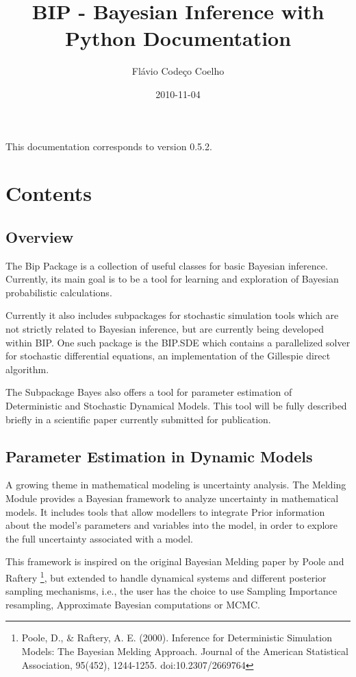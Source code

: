 \documentclass[a4paper,10pt,english]{sphinxmanual}
\title{BIP - Bayesian Inference with Python Documentation}
\date{2010-11-04}
\author{Flávio Codeço Coelho}
\begin{document}
\maketitle
\tableofcontents
{}\label{index::doc}


This documentation corresponds to version 0.5.2.


\chapter{Contents}
\label{index:contents}\label{index:welcome-to-bip-bayesian-inference-with-python-s-documentation}

\section{Overview}
\label{overview:overview}\label{overview::doc}
The Bip Package is a collection of useful classes for basic Bayesian inference. Currently, its main goal is to be a tool for learning and exploration of Bayesian probabilistic calculations.

Currently it also includes subpackages for stochastic simulation tools which are not strictly related to Bayesian inference, but are currently being developed within BIP. One such package is the BIP.SDE which contains a parallelized solver for stochastic differential equations, an implementation of the Gillespie direct algorithm.

The Subpackage Bayes also offers a tool for parameter estimation of Deterministic and Stochastic Dynamical Models. This tool will be fully described briefly in a scientific paper currently submitted for publication.


\section{Parameter Estimation in Dynamic Models}
\label{paramest:parameter-estimation-in-dynamic-models}\label{paramest::doc}
A growing theme in mathematical modeling is uncertainty analysis. The Melding Module provides a Bayesian framework to analyze uncertainty in mathematical models. It includes tools that allow modellers to integrate Prior information about the model's parameters and variables into the model, in order to explore the full uncertainty associated with a model.

This framework is inspired on the original Bayesian Melding paper by Poole and Raftery \footnote{
Poole, D., \& Raftery, A. E. (2000). Inference for Deterministic Simulation Models: The Bayesian Melding Approach. Journal of the American Statistical Association, 95(452), 1244-1255. doi:10.2307/2669764
}, but extended to handle dynamical systems and different posterior sampling mechanisms, i.e., the user has the choice to use Sampling Importance resampling, Approximate Bayesian computations or MCMC.
\end{document}
